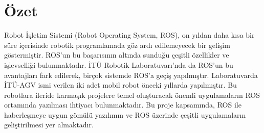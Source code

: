 

\chapter{\"Ozet}
Robot İşletim Sistemi (Robot Operating System, ROS), on yıldan daha kısa bir süre içerisinde robotik programlamada göz ardı edilemeyecek bir gelişim göstermiştir. ROS’un bu başarısının altında sunduğu çeşitli özellikler ve işlevselliği bulunmaktadır. İTÜ Robotik Laboratuvarı’nda da ROS’un bu avantajları fark edilerek, birçok sistemde ROS’a geçiş yapılmıştır. Laboratuvarda İTÜ-AGV ismi verilen iki adet mobil robot önceki yıllarda yapılmıştır. Bu robotlara ileride karmaşık projelere temel oluşturacak önemli uygulamaların ROS ortamında yazılması ihtiyacı bulunmaktadır. Bu proje kapsamında, ROS ile haberleşmeye uygun gömülü yazılımın ve ROS üzerinde çeşitli uygulamaların geliştirilmesi yer almaktadır.